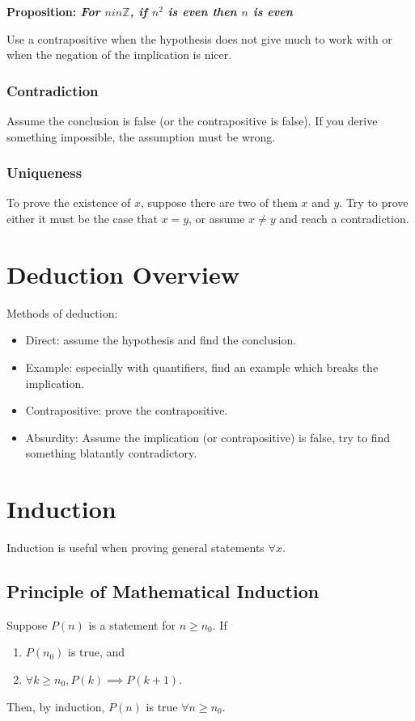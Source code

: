 \documentclass[12pt]{article}
\newcommand{\proposition}[1]{{\bf Proposition: \textit{#1}}}
\begin{document}
\proposition{For $n in \mathbb{Z}$, if $n^2$ is even then $n$ is even}


Use a contrapositive when the hypothesis does not give much to work with or when the negation of the implication is nicer.

\subsubsection*{Contradiction}
Assume the conclusion is false (or the contrapositive is false). If you derive something impossible, the assumption must be wrong.

\subsubsection*{Uniqueness}
To prove the existence of $x$, suppose there are two of them $x$ and $y$. Try to prove either it must be the case that $x = y$, or assume $x \neq y$ and reach a contradiction.

\section*{Deduction Overview}
Methods of deduction:
\begin{itemize}
\item Direct: assume the hypothesis and find the conclusion.
\item Example: especially with quantifiers, find an example which breaks the implication.
\item Contrapositive: prove the contrapositive.
\item Absurdity: Assume the implication (or contrapositive) is false, try to find something blatantly contradictory.
\end{itemize}

\section*{Induction}
Induction is useful when proving general statements $\forall x$.

\subsection*{Principle of Mathematical Induction}
Suppose $P(n)$ is a statement for $n \geq n_0$. If
\begin{enumerate}
\item $P(n_0)$ is true, and
\item $\forall k \geq n_0, P(k) \implies P(k+1)$.
\end{enumerate}
Then, by induction, $P(n)$ is true $\forall n \geq n_0$.
\end{document}
